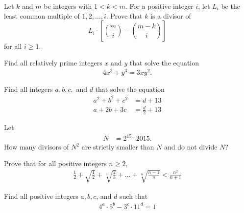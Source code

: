 \documentclass[problems.tex]{subfile}
\begin{document}
	\begin{problem}
		Let $k$ and $m$ be integers with $1 < k < m$. For a positive integer $i$, let $L_i$ be the least common multiple of $1,2,\ldots,i$.
		Prove that $k$ is a divisor of $$L_i \cdot \left[\binom{m}{i} - \binom{m-k}{i}\right]$$ for all $i \geq 1$. %
	\end{problem}


	\begin{problem}
		Find all relatively prime integers $x$ and $y$ that solve the equation
		\begin{align*}
			4x^3 + y^3 = 3xy^2.
		\end{align*}
	\end{problem}


	\begin{problem}
		Find all integers $a,b,c,$ and $d$ that solve the equation
		\begin{align*}
			a^2 + b^2 + c^2 &= d + 13\\
			a + 2b + 3c &= \frac{d}{2}+ 13
		\end{align*}
	\end{problem}



	\begin{problem}
		Let
		\begin{align*}
			N &= 2^{15} \cdot 2015.
		\end{align*}
		How many divisors of $N^2$ are strictly smaller than $N$ and do not divide $N$?
	\end{problem}



	\begin{problem}
		Prove that for all positive integers $n \geq 2$,
		\begin{align*}
			\frac{1}{2} + \sqrt{\frac{1}{2}}+ \sqrt[3]{\frac{2}{3}}+ \dots + \sqrt[n]{\frac{n-1}{n}} < \frac{n^2}{n+1}
		\end{align*}
	\end{problem}



	\begin{problem}
		Find all positive integers $a, b, c$, and $d$ such that
		\begin{align*}
			4^a \cdot 5^b - 3^c \cdot 11^d = 1
		\end{align*}
	\end{problem}
\end{document}
